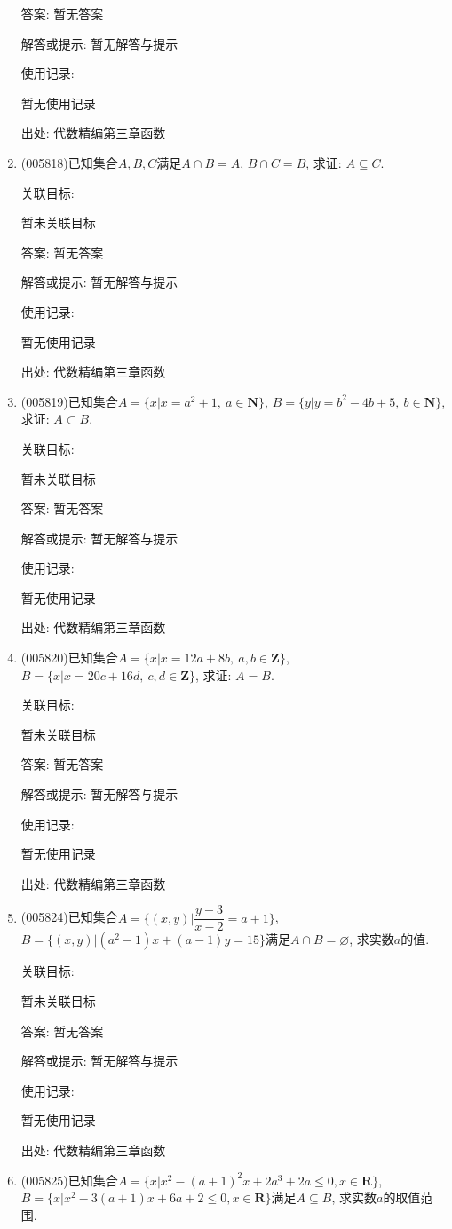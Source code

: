 \documentclass[10pt,a4paper]{article}
\begin{document}
\begin{enumerate}[1.]
答案: 暂无答案

解答或提示: 暂无解答与提示

使用记录:

暂无使用记录


出处: 代数精编第三章函数
\item { (005818)}已知集合$A,B,C$满足$A\cap B=A$, $B\cap C=B$, 求证: $A\subseteq C$.


关联目标:

暂未关联目标

答案: 暂无答案

解答或提示: 暂无解答与提示

使用记录:

暂无使用记录


出处: 代数精编第三章函数
\item { (005819)}已知集合$A=\{x|x=a^2+1,\ a\in \mathbf{N}\}$, $B=\{y|y=b^2-4b+5,\ b\in \mathbf{N}\}$, 求证: $A\subset B$.


关联目标:

暂未关联目标

答案: 暂无答案

解答或提示: 暂无解答与提示

使用记录:

暂无使用记录


出处: 代数精编第三章函数
\item { (005820)}已知集合$A=\{x|x=12a+8b,\ a,b\in \mathbf{Z}\}$, $B=\{x|x=20c+16d,\ c,d\in \mathbf{Z}\}$, 求证: $A=B$.


关联目标:

暂未关联目标

答案: 暂无答案

解答或提示: 暂无解答与提示

使用记录:

暂无使用记录


出处: 代数精编第三章函数
\item { (005824)}已知集合$A=\{(x,y)|\dfrac{y-3}{x-2}=a+1\}$, $B=\{(x,y)|(a^2-1)x+(a-1)y=15\}$满足$A\cap B=\varnothing$, 求实数$a$的值.


关联目标:

暂未关联目标

答案: 暂无答案

解答或提示: 暂无解答与提示

使用记录:

暂无使用记录


出处: 代数精编第三章函数
\item { (005825)}已知集合$A=\{x|x^2-(a+1)^2x+2a^3+2a\le 0,x\in \mathbf{R}\}$, $B=\{x|x^2-3(a+1)x+6a+2\le 0,x\in \mathbf{R}\}$满足$A\subseteq B$, 求实数$a$的取值范围.



\end{enumerate}
\end{document}
